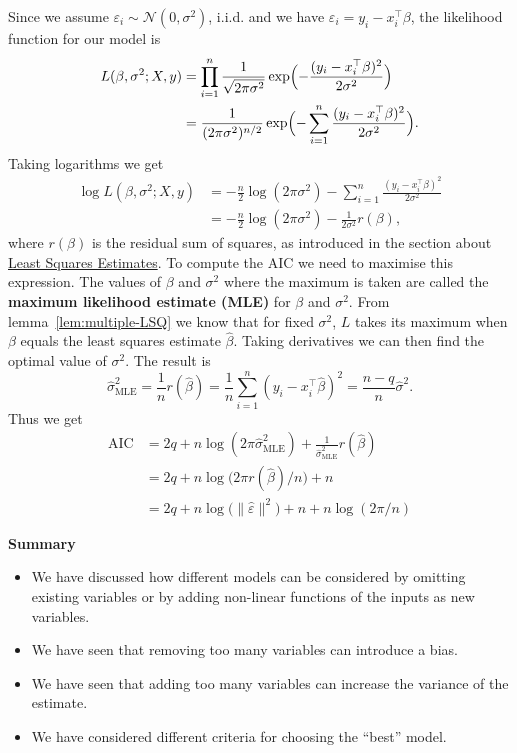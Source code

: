 \documentclass[
  a4paper,
]{article}
\providecommand{\tightlist}{%
  \setlength{\itemsep}{0pt}\setlength{\parskip}{0pt}}
\theoremstyle{definition}
\theoremstyle{definition}
\theoremstyle{definition}
\theoremstyle{definition}
\theoremstyle{remark}
\begin{document}
\begin{enumerate}
  Since we assume \(\varepsilon_i \sim \mathcal{N}(0, \sigma^2)\), i.i.d. and
  we have \(\varepsilon_i = y_i - x_i^\top\beta\), the likelihood function
  for our model is
  \begin{align*}
    L(\beta, \sigma^2; X, y)
    &= \prod_{i=1}^n \frac{1}{\sqrt{2\pi\sigma^2}} \exp\Bigl( - \frac{(y_i - x_i^\top\beta)^2}{2\sigma^2} \Bigr) \\
    &= \frac{1}{(2\pi\sigma^2)^{n/2}} \exp\Bigl( - \sum_{i=1}^n \frac{(y_i - x_i^\top\beta)^2}{2\sigma^2} \Bigr).
  \end{align*}
  Taking logarithms we get
  \begin{align*}
    \log L(\beta, \sigma^2; X, y)
    &= -\frac{n}{2} \log(2\pi\sigma^2) - \sum_{i=1}^n \frac{(y_i - x_i^\top\beta)^2}{2\sigma^2} \\
    &= -\frac{n}{2} \log(2\pi\sigma^2) - \frac{1}{2\sigma^2} r(\beta),
  \end{align*}
  where \(r(\beta)\) is the residual sum of squares, as introduced
  in the section about \protect\hyperlink{S02-multiple}{Least Squares Estimates}. To compute the AIC
  we need to maximise this expression. The values of \(\beta\) and \(\sigma^2\)
  where the maximum is taken are called the \textbf{maximum likelihood estimate (MLE)}
  for \(\beta\) and \(\sigma^2\). From lemma~\ref{lem:multiple-LSQ} we know
  that for fixed \(\sigma^2\), \(L\) takes its maximum when \(\beta\) equals the
  least squares estimate \(\hat\beta\). Taking derivatives we can then
  find the optimal value of \(\sigma^2\). The result is
  \begin{equation*}
    \hat\sigma^2_\mathrm{MLE}
    = \frac1n r(\hat\beta)
    = \frac{1}{n} \sum_{i=1}^n (y_i - x_i^\top \hat\beta)^2
    = \frac{n-q}{n} \hat\sigma^2.
  \end{equation*}
  Thus we get
  \begin{align*}
    \mathrm{AIC}
    &= 2q + n \log(2\pi\hat\sigma^2_\mathrm{MLE}) + \frac{1}{\hat\sigma^2_\mathrm{MLE}} r(\hat\beta) \\
    &= 2q + n \log\bigl( 2\pi r(\hat\beta) / n \bigr) + n \\
    &= 2q + n \log\bigl( \|\hat\varepsilon\|^2 \bigr) + n + n \log( 2\pi / n )
  \end{align*}
\end{enumerate}

\textbf{Summary}

\begin{itemize}
\tightlist
\item
  We have discussed how different models can be considered by omitting
  existing variables or by adding non-linear functions of the inputs
  as new variables.
\item
  We have seen that removing too many variables can introduce a bias.
\item
  We have seen that adding too many variables can increase the variance
  of the estimate.
\item
  We have considered different criteria for choosing the ``best'' model.
\end{itemize}
\end{document}
